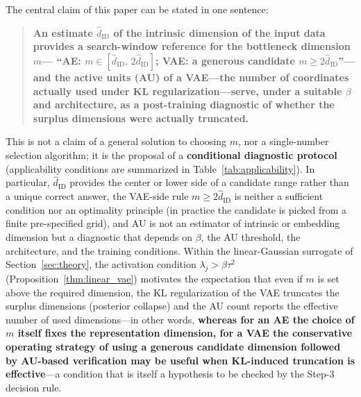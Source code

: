 \documentclass[make,article,submit,pdftex,moreauthors]{Definitions/mdpi}
\newcommand{\hatdID}{\hat{d}_{\mathrm{ID}}}
\begin{document}
The central claim of this paper can be stated in one sentence:
\begin{quote}
\textbf{An estimate $\hatdID$ of the intrinsic dimension of the input data
provides a search-window reference for the bottleneck dimension $m$---%
``AE: $m \in [\hatdID,\, 2\hatdID]$; VAE: a generous candidate
$m \geq 2\hatdID$''---and the active units (AU) of a VAE---the number of
coordinates actually used under KL regularization---serve, under a suitable
$\beta$ and architecture, as a post-training diagnostic of whether the
surplus dimensions were actually truncated.}
\end{quote}
This is not a claim of a general solution to choosing $m$, nor a
single-number selection algorithm; it is the proposal of a
\textbf{conditional diagnostic protocol}
(applicability conditions are summarized in
Table~\ref{tab:applicability}).
In particular, $\hatdID$ provides the center or lower side of a candidate
range rather than a unique correct answer, the VAE-side rule
$m \geq 2\hatdID$ is neither a sufficient condition nor an optimality
principle (in practice the candidate is picked from a finite pre-specified
grid), and AU is not an estimator of intrinsic or embedding dimension but a
diagnostic that depends on $\beta$, the AU threshold, the architecture, and
the training conditions.
Within the linear-Gaussian surrogate of Section~\ref{sec:theory}, the
activation condition $\lambda_j > \beta\tau^2$
(Proposition~\ref{thm:linear_vae}) motivates the expectation that even if $m$ is set above
the required dimension, the KL regularization of the VAE truncates the
surplus dimensions (posterior collapse) and the AU count reports the
effective number of used dimensions---in other words,
\textbf{whereas for an AE the choice of $m$ itself fixes the representation
dimension, for a VAE the conservative operating strategy of using a generous
candidate dimension followed by AU-based verification may be useful when
KL-induced truncation is effective}---a condition that is itself a
hypothesis to be checked by the Step-3 decision rule.
\end{document}
